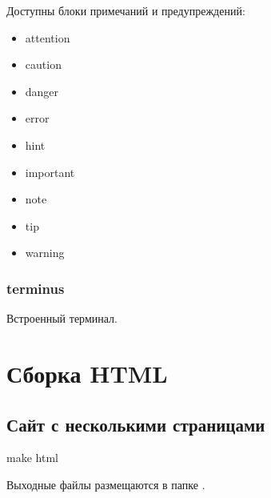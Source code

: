 \documentclass[a4paper,12pt,russian]{sphinxmanual}
\begin{document}
Доступны блоки примечаний и предупреждений:
\begin{itemize}
\item {} 
attention

\item {} 
caution

\item {} 
danger

\item {} 
error

\item {} 
hint

\item {} 
important

\item {} 
note

\item {} 
tip

\item {} 
warning

\end{itemize}



\subsubsection{terminus}
\label{\detokenize{editor:terminus}}
Встроенный терминал.



\section{Сборка HTML}
\label{\detokenize{html:html}}\label{\detokenize{html::doc}}

\subsection{Сайт с несколькими страницами}
\label{\detokenize{html:id1}}
\begin{sphinxVerbatim}[commandchars=\\\{\}]
make html
\end{sphinxVerbatim}

Выходные файлы размещаются в папке .
\end{document}
